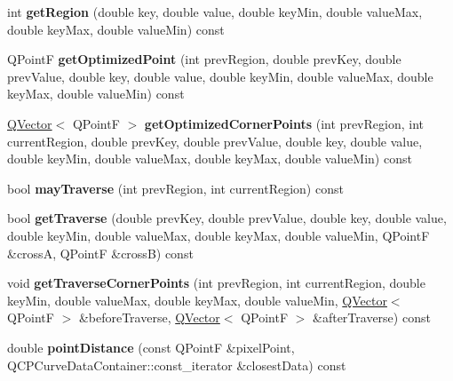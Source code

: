 \begin{DoxyCompactItemize}
\item 
int {\bfseries get\+Region} (double key, double value, double key\+Min, double value\+Max, double key\+Max, double value\+Min) const \hypertarget{class_q_c_p_curve_a8e0df32978cc526d2f3f0e342834bd4c}{}\label{class_q_c_p_curve_a8e0df32978cc526d2f3f0e342834bd4c}

\item 
Q\+PointF {\bfseries get\+Optimized\+Point} (int prev\+Region, double prev\+Key, double prev\+Value, double key, double value, double key\+Min, double value\+Max, double key\+Max, double value\+Min) const \hypertarget{class_q_c_p_curve_a4ed1566795ea51d519f9f0d17f0f131d}{}\label{class_q_c_p_curve_a4ed1566795ea51d519f9f0d17f0f131d}

\item 
\hyperlink{class_q_vector}{Q\+Vector}$<$ Q\+PointF $>$ {\bfseries get\+Optimized\+Corner\+Points} (int prev\+Region, int current\+Region, double prev\+Key, double prev\+Value, double key, double value, double key\+Min, double value\+Max, double key\+Max, double value\+Min) const \hypertarget{class_q_c_p_curve_a929433e67ae3e3770236abea5f1e7a6d}{}\label{class_q_c_p_curve_a929433e67ae3e3770236abea5f1e7a6d}

\item 
bool {\bfseries may\+Traverse} (int prev\+Region, int current\+Region) const \hypertarget{class_q_c_p_curve_ae5b232c8201441a940516c745309a685}{}\label{class_q_c_p_curve_ae5b232c8201441a940516c745309a685}

\item 
bool {\bfseries get\+Traverse} (double prev\+Key, double prev\+Value, double key, double value, double key\+Min, double value\+Max, double key\+Max, double value\+Min, Q\+PointF \&crossA, Q\+PointF \&crossB) const \hypertarget{class_q_c_p_curve_aa5ba854363f7343c829e37c7d19830cd}{}\label{class_q_c_p_curve_aa5ba854363f7343c829e37c7d19830cd}

\item 
void {\bfseries get\+Traverse\+Corner\+Points} (int prev\+Region, int current\+Region, double key\+Min, double value\+Max, double key\+Max, double value\+Min, \hyperlink{class_q_vector}{Q\+Vector}$<$ Q\+PointF $>$ \&before\+Traverse, \hyperlink{class_q_vector}{Q\+Vector}$<$ Q\+PointF $>$ \&after\+Traverse) const \hypertarget{class_q_c_p_curve_ab231faca0b8d53c19be37c1baea14dd8}{}\label{class_q_c_p_curve_ab231faca0b8d53c19be37c1baea14dd8}

\item 
double {\bfseries point\+Distance} (const Q\+PointF \&pixel\+Point, Q\+C\+P\+Curve\+Data\+Container\+::const\+\_\+iterator \&closest\+Data) const \hypertarget{class_q_c_p_curve_ad95dda62d82d34271cdd22708a278d97}{}\label{class_q_c_p_curve_ad95dda62d82d34271cdd22708a278d97}


\end{DoxyCompactItemize}
